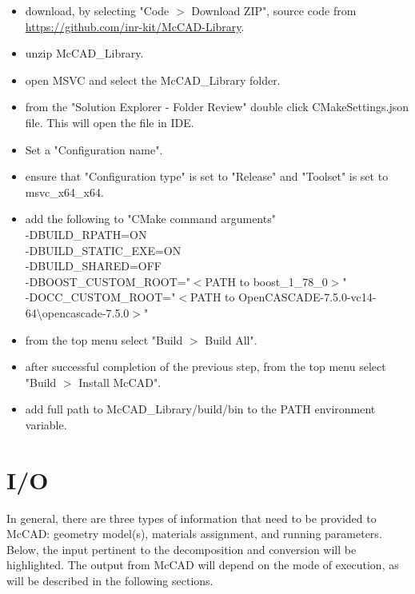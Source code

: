 \documentclass[12pt, a4paper, titlepage]{article}
\begin{document}
\begin{itemize}
	  \begin{itemize}
		\item download, by selecting "Code $>$ Download ZIP", source code from \\\url{https://github.com/inr-kit/McCAD-Library}.
		\item unzip McCAD\_Library.
		\item open MSVC and select the McCAD\_Library folder.
		\item from the "Solution Explorer - Folder Review" double click CMakeSettings.json file. This will open the file in IDE. \item Set a "Configuration name". 
		\item ensure that "Configuration type" is set to "Release" and "Toolset" is set to msvc\_x64\_x64.
		\item add the following to "CMake command arguments" \\-DBUILD\_RPATH=ON \\-DBUILD\_STATIC\_EXE=ON \\-DBUILD\_SHARED=OFF \\-DBOOST\_CUSTOM\_ROOT="$<$PATH to boost\_1\_78\_0$>$" \\-DOCC\_CUSTOM\_ROOT="$<$PATH to OpenCASCADE-7.5.0-vc14-64\textbackslash opencascade-7.5.0$>$"
		\item from the top menu select "Build $>$ Build All".
		\item after successful completion of the previous step, from the top menu select "Build $>$ Install McCAD".
		\item add full path to McCAD\_Library/build/bin to the PATH environment variable. 
	  \end{itemize}
    \end{itemize}

\section{I/O} \label{sec:I/O}
In general, there are three types of information that need to be provided to McCAD: geometry model(s), materials assignment, and running parameters. Below, the input pertinent to the decomposition and conversion will be highlighted. The output from McCAD will depend on the mode of execution, as will be described in the following sections.
\end{document}
